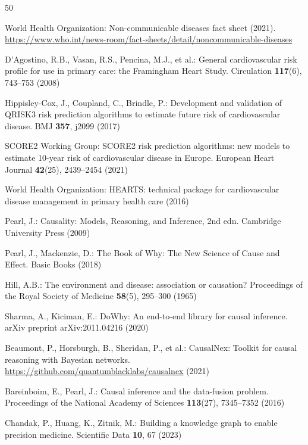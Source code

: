 \documentclass[runningheads]{llncs}
\begin{document}
\begin{thebibliography}{50}

World Health Organization:
Non-communicable diseases fact sheet (2021).
\url{https://www.who.int/news-room/fact-sheets/detail/noncommunicable-diseases}

D'Agostino, R.B., Vasan, R.S., Pencina, M.J., et al.:
General cardiovascular risk profile for use in primary care: the
Framingham Heart Study.
Circulation \textbf{117}(6), 743--753 (2008)

Hippisley-Cox, J., Coupland, C., Brindle, P.:
Development and validation of QRISK3 risk prediction algorithms to
estimate future risk of cardiovascular disease.
BMJ \textbf{357}, j2099 (2017)

SCORE2 Working Group:
SCORE2 risk prediction algorithms: new models to estimate 10-year
risk of cardiovascular disease in Europe.
European Heart Journal \textbf{42}(25), 2439--2454 (2021)

World Health Organization:
HEARTS: technical package for cardiovascular disease management in
primary health care (2016)

Pearl, J.:
Causality: Models, Reasoning, and Inference, 2nd edn.
Cambridge University Press (2009)

Pearl, J., Mackenzie, D.:
The Book of Why: The New Science of Cause and Effect.
Basic Books (2018)

Hill, A.B.:
The environment and disease: association or causation?
Proceedings of the Royal Society of Medicine \textbf{58}(5),
295--300 (1965)

Sharma, A., Kiciman, E.:
DoWhy: An end-to-end library for causal inference.
arXiv preprint arXiv:2011.04216 (2020)

Beaumont, P., Horsburgh, B., Sheridan, P., et al.:
CausalNex: Toolkit for causal reasoning with Bayesian networks.
\url{https://github.com/quantumblacklabs/causalnex} (2021)

Bareinboim, E., Pearl, J.:
Causal inference and the data-fusion problem.
Proceedings of the National Academy of Sciences \textbf{113}(27),
7345--7352 (2016)

Chandak, P., Huang, K., Zitnik, M.:
Building a knowledge graph to enable precision medicine.
Scientific Data \textbf{10}, 67 (2023)


\end{thebibliography}
\end{document}
